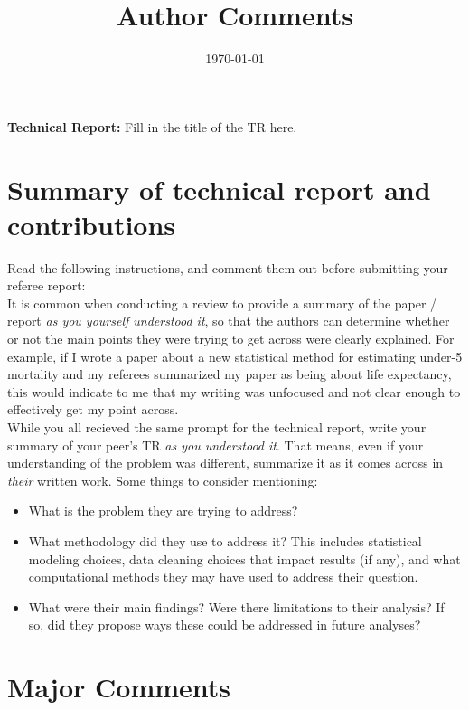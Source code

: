 \documentclass[11pt]{article}
\title{Author Comments}
\author{}
\date{\today}
\begin{document}
\maketitle

\noindent \textbf{Technical Report:} Fill in the title of the TR here.\\

\section*{Summary of technical report and contributions}

Read the following instructions, and comment them out before submitting your referee report: \\

\noindent It is common when conducting a review to provide a summary of the paper / report \textit{as you yourself understood it}, so that the authors can determine whether or not the main points they were trying to get across were clearly explained. For example, if I wrote a paper about a new statistical method for estimating under-5 mortality and my referees summarized my paper as being about life expectancy, this would indicate to me that my writing was unfocused and not clear enough to effectively get my point across. \\

\noindent While you all recieved the same prompt for the technical report, write your summary of your peer's TR \textit{as you understood it}. That means, even if your understanding of the problem was different, summarize it as it comes across in \textit{their} written work. Some things to consider mentioning:

\begin{itemize}
    \item What is the problem they are trying to address?
    \item What methodology did they use to address it? This includes statistical modeling choices, data cleaning choices that impact results (if any), and what computational methods they may have used to address their question.
    \item What were their main findings? Were there limitations to their analysis? If so, did they propose ways these could be addressed in future analyses?
\end{itemize}

\section*{Major Comments}
\end{document}
